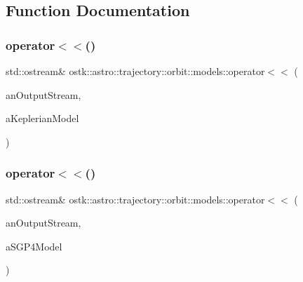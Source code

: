 \subsection{Function Documentation}
\mbox{\label{namespaceostk_1_1astro_1_1trajectory_1_1orbit_1_1models_a57c1332ade54f2075a0efee474d5b46d}} 
\subsubsection{\texorpdfstring{operator$<$$<$()}{operator<<()}\hspace{0.1cm}{\footnotesize\ttfamily [1/2]}}
{\footnotesize\ttfamily std\+::ostream\& ostk\+::astro\+::trajectory\+::orbit\+::models\+::operator$<$$<$ (\begin{DoxyParamCaption}\item[{std\+::ostream \&}]{an\+Output\+Stream,  }\item[{const \hyperlink{classostk_1_1astro_1_1trajectory_1_1orbit_1_1models_1_1_kepler}{Kepler} \&}]{a\+Keplerian\+Model }\end{DoxyParamCaption})}

\mbox{\label{namespaceostk_1_1astro_1_1trajectory_1_1orbit_1_1models_a5683eb8d1e09c5efb5f98e43a439284c}} 
\subsubsection{\texorpdfstring{operator$<$$<$()}{operator<<()}\hspace{0.1cm}{\footnotesize\ttfamily [2/2]}}
{\footnotesize\ttfamily std\+::ostream\& ostk\+::astro\+::trajectory\+::orbit\+::models\+::operator$<$$<$ (\begin{DoxyParamCaption}\item[{std\+::ostream \&}]{an\+Output\+Stream,  }\item[{const \hyperlink{classostk_1_1astro_1_1trajectory_1_1orbit_1_1models_1_1_s_g_p4}{S\+G\+P4} \&}]{a\+S\+G\+P4\+Model }\end{DoxyParamCaption})}

